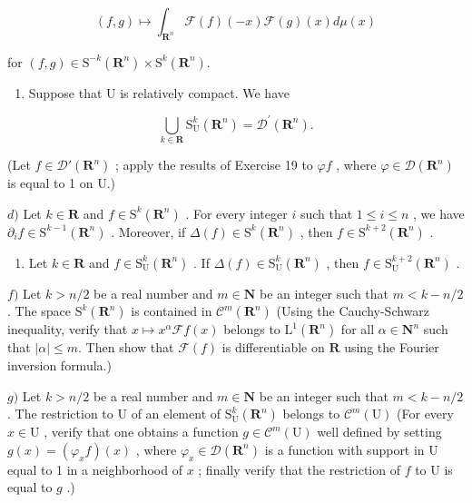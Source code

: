 \[
(f, g) \mapsto \int_ {\mathbf {R} ^ {n}} \mathcal {F} (f) (- x) \mathcal {F} (g) (x) d \mu (x)
\]

for \((f,g)\in \mathrm{S}^{-k}(\mathbf{R}^n)\times \mathrm{S}^k (\mathbf{R}^n).\)

\begin{enumerate}
\def\labelenumi{\alph{enumi})}
\setcounter{enumi}{2}
\tightlist
\item
  Suppose that U is relatively compact. We have
\end{enumerate}

\[
\bigcup_ {k \in \mathbf {R}} \mathrm{S} _ {\mathrm{U}} ^ {k} (\mathbf {R} ^ {n}) = \mathcal {D} ^ {\prime} (\mathbf {R} ^ {n}).
\]

(Let \(f \in \mathcal{D}'(\mathbf{R}^n)\) ; apply the results of Exercise 19 to \(\varphi f\) , where \(\varphi \in \mathcal{D}(\mathbf{R}^n)\) is equal to 1 on U.)

\(d)\) Let \(k \in \mathbf{R}\) and \(f \in \mathrm{S}^k(\mathbf{R}^n)\) . For every integer \(i\) such that \(1 \leqslant i \leqslant n\) , we have \(\partial_i f \in \mathrm{S}^{k-1}(\mathbf{R}^n)\) . Moreover, if \(\Delta(f) \in \mathrm{S}^k(\mathbf{R}^n)\) , then \(f \in \mathrm{S}^{k+2}(\mathbf{R}^n)\) .

\begin{enumerate}
\def\labelenumi{\alph{enumi})}
\setcounter{enumi}{4}
\tightlist
\item
  Let \(k \in \mathbf{R}\) and \(f \in \mathrm{S}_{\mathrm{U}}^{k}(\mathbf{R}^{n})\) . If \(\Delta(f) \in \mathrm{S}_{\mathrm{U}}^{k}(\mathbf{R}^{n})\) , then \(f \in \mathrm{S}_{\mathrm{U}}^{k+2}(\mathbf{R}^{n})\) .
\end{enumerate}

\(f)\) Let \(k > n/2\) be a real number and \(m \in \mathbf{N}\) be an integer such that \(m < k - n/2\) . The space \(\mathrm{S}^k(\mathbf{R}^n)\) is contained in \(\mathcal{C}^m(\mathbf{R}^n)\) (Using the Cauchy-Schwarz inequality, verify that \(x \mapsto x^\alpha \mathscr{F} f(x)\) belongs to \(\mathrm{L}^1(\mathbf{R}^n)\) for all \(\alpha \in \mathbf{N}^n\) such that \(|\alpha| \leqslant m\). Then show that \(\mathscr{F}(f)\) is differentiable on \(\mathbf{R}\) using the Fourier inversion formula.)

\(g)\) Let \(k > n/2\) be a real number and \(m \in \mathbf{N}\) be an integer such that \(m < k - n/2\). The restriction to U of an element of \(\mathrm{S}_{\mathrm{U}}^{k}(\mathbf{R}^{n})\) belongs to \(\mathcal{C}^{m}(\mathrm{U})\) (For every \(x \in \mathrm{U}\) , verify that one obtains a function \(g \in \mathcal{C}^{m}(\mathrm{U})\) well defined by setting \(g(x) = (\varphi_{x}f)(x)\) , where \(\varphi_{x} \in \mathcal{D}(\mathbf{R}^{n})\) is a function with support in U equal to 1 in a neighborhood of \(x\) ; finally verify that the restriction of \(f\) to U is equal to \(g\) .)

